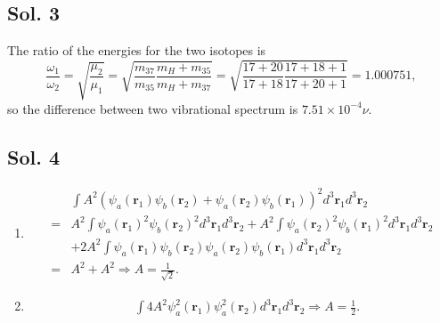 \subsection*{Sol. 3}
The ratio of the energies for the two isotopes is 
$$
\frac{\omega_1}{\omega_2}
=\sqrt{\frac{\mu_2}{\mu_1}}
=\sqrt{\frac{m_{37}}{m_{35}}\frac{m_H+m_{35}}{m_H+m_{37}}}
=\sqrt{\frac{17+20}{17+18}\frac{17+18+1}{17+20+1}}
=1.000751,
$$
so the difference between two vibrational spectrum is 
$7.51\times 10^{-4}\nu.$

\subsection*{Sol. 4}
\begin{enumerate}
    \item 
    \begin{align*}
        &\int A^2
        (\psi_a(\bm r_1)\psi_b(\bm r_2)
        +\psi_a(\bm r_2)\psi_b(\bm r_1))^2
        d^3\bm r_1
        d^3\bm r_2\\
        =&
        A^2\int
        \psi_a(\bm r_1)^2
        \psi_b(\bm r_2)^2
        d^3\bm r_1
        d^3\bm r_2
        +
        A^2\int
        \psi_a(\bm r_2)^2
        \psi_b(\bm r_1)^2
        d^3\bm r_1
        d^3\bm r_2\\
        &+
        2A^2\int
        \psi_a(\bm r_1)
        \psi_b(\bm r_2)
        \psi_a(\bm r_2)
        \psi_b(\bm r_1)
        d^3\bm r_1
        d^3\bm r_2\\
        =&
        A^2+A^2\Rightarrow A=\frac{1}{\sqrt{2}}.
    \end{align*}
    \item 
    \begin{align*}
        &\int 4A^2
        \psi_a^2(\bm r_1)
        \psi_a^2(\bm r_2)
        d^3\bm r_1
        d^3\bm r_2
        \Rightarrow A=\frac{1}{2}.
    \end{align*}
\end{enumerate}

